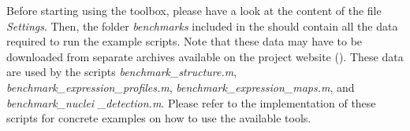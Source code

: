 
Before starting using the \wingj \matlab toolbox, please have a look at the content of the \matlab file \textit{Settings}. Then, the folder \textit{benchmarks} included in the \wingjMatlab should contain all the data required to run the example scripts. Note that these data may have to be downloaded from separate archives available on the project website (\wingjShortUrl). These data are used by the \matlab scripts \textit{benchmark\_structure.m}, \textit{benchmark\_expression\_profiles.m}, \textit{benchmark\_expression\_maps.m}, and \textit{benchmark\_nuclei} \textit{\_detection.m}. Please refer to the implementation of these scripts for concrete examples on how to use the available tools.